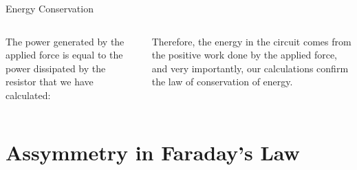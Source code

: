 \documentclass[12pt,aspectratio=169]{beamer}
\begin{document}
\begin{frame}{Energy Conservation}
  \begin{columns}
    \centering
        
    The power generated by the applied force is equal to the power dissipated
    by the resistor that we have calculated:


    Therefore, the energy in the circuit comes from the positive work done by
    the applied force, and very importantly, our calculations confirm the law of
    conservation of energy.
  \end{columns}
\end{frame}



\section{Assymmetry in Faraday's Law}
\end{document}
